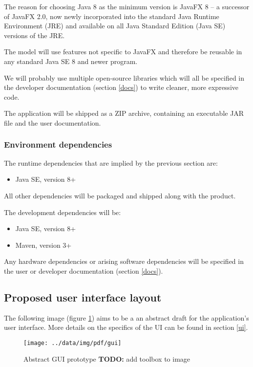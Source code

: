 \documentclass[10pt,a4paper,oneside]{article}
\newcommand{\TODO}[1]{{\textbf{TODO:} #1}} %
\begin{document}
The reason for choosing Java 8 as the minimum version is JavaFX 8 -- a successor of JavaFX 2.0, now newly incorporated into
the standard Java Runtime Environment (JRE) and available on all Java Standard Edition (Java SE) versions of the JRE.

The model will use features not specific to JavaFX and therefore be reusable in any standard Java SE 8 and newer program.

We will probably use multiple open-source libraries which will all be specified in the developer documentation (section \ref{docs})
to write cleaner, more expressive code.

The application will be shipped as a ZIP archive, containing an executable JAR file and the user documentation.

\subsubsection{Environment dependencies}

The runtime dependencies that are implied by the previous section are:
\begin{itemize}
\item Java SE, version 8+
\end{itemize}
All other dependencies will be packaged and shipped along with the product.

The development dependencies will be:
\begin{itemize}
\item Java SE, version 8+
\item Maven, version 3+
\end{itemize}

Any hardware dependencies or arising software dependencies will be specified in the user or developer documentation (section \ref{docs}).

\subsection{Proposed user interface layout} \label{ui-layout}

The following image (figure \ref{fig:gui}) aims to be a an abstract draft for the application's user interface.
More details on the specifics of the UI can be found in section \ref{ui}.
\begin{figure}[h]
        \centering
        \texttt{[image: ../data/img/pdf/gui]}
        \caption{Abstract GUI prototype \TODO add toolbox to image}
        \label{fig:gui}
\end{figure}
\end{document}
